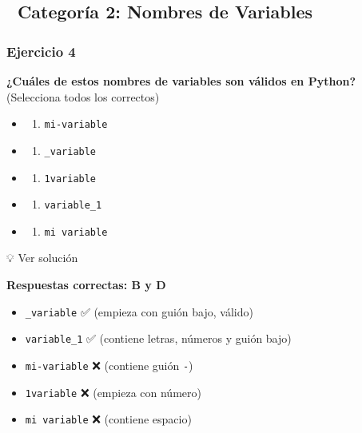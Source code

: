 \documentclass[
  doc,
  floatsintext,
  longtable,
  a4paper,
  nolmodern,
  notxfonts,
  notimes,
  12pt,
  colorlinks=true,linkcolor=blue,citecolor=blue,urlcolor=blue]{apa7}
\providecommand{\tightlist}{%
  \setlength{\itemsep}{0pt}\setlength{\parskip}{0pt}}
\begin{document}
\subsection{📌 Categoría 2: Nombres de
Variables}\label{categoruxeda-2-nombres-de-variables}

\subsubsection{Ejercicio 4}\label{ejercicio-4}

\textbf{¿Cuáles de estos nombres de variables son válidos en Python?}
(Selecciona todos los correctos)

\begin{itemize}
\tightlist
\item
  \begin{enumerate}
  \def\labelenumi{\Alph{enumi})}
  \tightlist
  \item
    \texttt{mi-variable}
  \end{enumerate}
\item
  \begin{enumerate}
  \def\labelenumi{\Alph{enumi})}
  \setcounter{enumi}{1}
  \tightlist
  \item
    \texttt{\_variable}
  \end{enumerate}
\item
  \begin{enumerate}
  \def\labelenumi{\Alph{enumi})}
  \setcounter{enumi}{2}
  \tightlist
  \item
    \texttt{1variable}
  \end{enumerate}
\item
  \begin{enumerate}
  \def\labelenumi{\Alph{enumi})}
  \setcounter{enumi}{3}
  \tightlist
  \item
    \texttt{variable\_1}
  \end{enumerate}
\item
  \begin{enumerate}
  \def\labelenumi{\Alph{enumi})}
  \setcounter{enumi}{4}
  \tightlist
  \item
    \texttt{mi\ variable}
  \end{enumerate}
\end{itemize}

💡 Ver solución

\textbf{Respuestas correctas: B y D}

\begin{itemize}
\item
  \texttt{\_variable} ✅ (empieza con guión bajo, válido)
\item
  \texttt{variable\_1} ✅ (contiene letras, números y guión bajo)
\item
  \texttt{mi-variable} ❌ (contiene guión \texttt{-})
\item
  \texttt{1variable} ❌ (empieza con número)
\item
  \texttt{mi\ variable} ❌ (contiene espacio)
\end{itemize}
\end{document}
